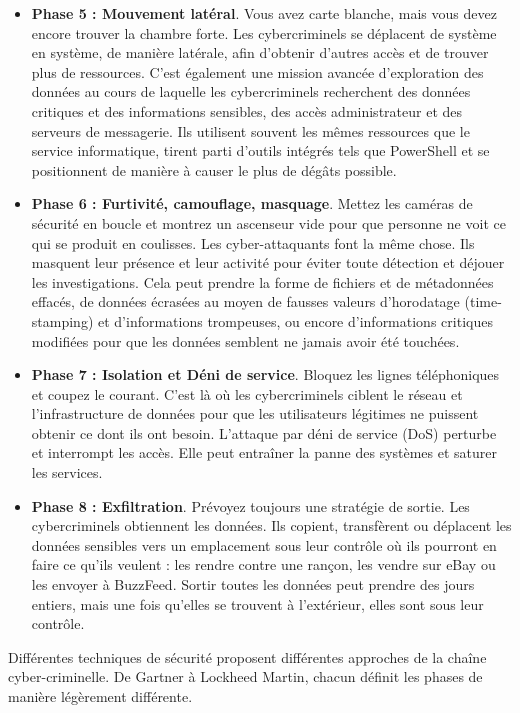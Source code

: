 \begin{itemize}
 \item \textbf{Phase 5 : Mouvement latéral}. Vous avez carte blanche, mais vous devez encore trouver la chambre forte. Les cybercriminels se déplacent de système en système, de manière latérale, afin d’obtenir d’autres accès et de trouver plus de ressources. C’est également une mission avancée d’exploration des données au cours de laquelle les cybercriminels recherchent des données critiques et des informations sensibles, des accès administrateur et des serveurs de messagerie. Ils utilisent souvent les mêmes ressources que le service informatique, tirent parti d’outils intégrés tels que PowerShell et se positionnent de manière à causer le plus de dégâts possible.

 \item \textbf{Phase 6 :  Furtivité, camouflage, masquage}. Mettez les caméras de sécurité en boucle et montrez un ascenseur vide pour que personne ne voit ce qui se produit en coulisses. Les cyber-attaquants font la même chose. Ils masquent leur présence et leur activité pour éviter toute détection et déjouer les investigations. Cela peut prendre la forme de fichiers et de métadonnées effacés, de données écrasées au moyen de fausses valeurs d’horodatage (time-stamping) et d’informations trompeuses, ou encore d’informations critiques modifiées pour que les données semblent ne jamais avoir été touchées.

 \item \textbf{Phase 7 :  Isolation et Déni de service}. Bloquez les lignes téléphoniques et coupez le courant. C’est là où les cybercriminels ciblent le réseau et l’infrastructure de données pour que les utilisateurs légitimes ne puissent obtenir ce dont ils ont besoin. L’attaque par déni de service (DoS) perturbe et interrompt les accès. Elle peut entraîner la panne des systèmes et saturer les services.

 \item \textbf{Phase 8 :  Exfiltration}. Prévoyez toujours une stratégie de sortie. Les cybercriminels obtiennent les données. Ils copient, transfèrent ou déplacent les données sensibles vers un emplacement sous leur contrôle où ils pourront en faire ce qu’ils veulent : les rendre contre une rançon, les vendre sur eBay ou les envoyer à BuzzFeed. Sortir toutes les données peut prendre des jours entiers, mais une fois qu’elles se trouvent à l’extérieur, elles sont sous leur contrôle.

\end{itemize}

Différentes techniques de sécurité proposent différentes approches de la chaîne cyber-criminelle. De Gartner à Lockheed Martin, chacun définit les phases de manière légèrement différente.

